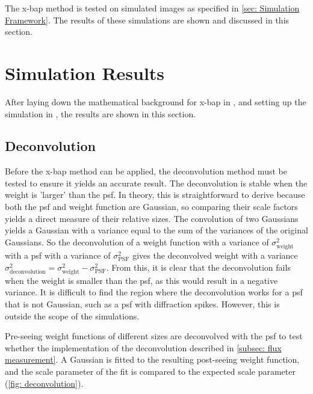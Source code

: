 The \gls{x-bap} method is tested on simulated images as specified in \autoref{sec: Simulation Framework}. The results of these simulations are shown and discussed in this section.

\newpage
\section{Simulation Results}
After laying down the mathematical background for \gls{x-bap} in , and setting up the simulation in , the results are shown in this section. 
\subsection{Deconvolution}\label{subsec: Deconvolution}

Before the \gls{x-bap} method can be applied, the deconvolution method must be tested to ensure it yields an accurate result. The deconvolution is stable when the weight is 'larger' than the \gls{psf}. In theory, this is straightforward to derive because both the \gls{psf} and weight function are Gaussian, so comparing their scale factors yields a direct measure of their relative sizes. The convolution of two Gaussians yields a Gaussian with a variance equal to the sum of the variances of the original Gaussians. So the deconvolution of a weight function with a variance of $\sigma_\mathrm{weight}^2$ with a \gls{psf} with a variance of $\sigma_\mathrm{PSF}^2$ gives the deconvolved weight with a variance $\sigma^2_\mathrm{deconvolution}=\sigma^2_\mathrm{weight}-\sigma^2_\mathrm{PSF}$. From this, it is clear that the deconvolution fails when the weight is smaller than the \gls{psf}, as this would result in a negative variance. It is difficult to find the region where the deconvolution works for a \gls{psf} that is not Gaussian, such as a \gls{psf} with diffraction spikes. However, this is outside the scope of the simulations.

Pre-seeing weight functions of different sizes are deconvolved with the \gls{psf} to test whether the implementation of the deconvolution described in \autoref{subsec: flux measurement}. A Gaussian is fitted to the resulting post-seeing weight function, and the scale parameter of the fit is compared to the expected scale parameter (\autoref{fig: deconvolution}).  

